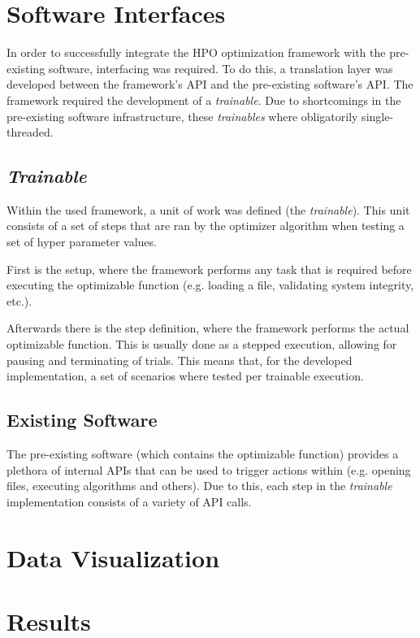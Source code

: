 \documentclass[runningheads]{llncs}
\begin{document}
\section{Software Interfaces}

In order to successfully integrate the HPO optimization framework with the pre-existing software, interfacing was required. To do this, a translation layer was developed between the framework's API and the pre-existing software's API. The framework required the development of a \textit{trainable}. Due to shortcomings in the pre-existing software infrastructure, these \textit{trainables} where obligatorily single-threaded.

\subsection{\textit{Trainable}}

Within the used framework, a unit of work was defined (the \textit{trainable}). This unit consists of a set of steps that are ran by the optimizer algorithm when testing a set of hyper parameter values.

First is the setup, where the framework performs any task that is required before executing the optimizable function (e.g. loading a file, validating system integrity, etc.).

Afterwards there is the step definition, where the framework performs the actual optimizable function. This is usually done as a stepped execution, allowing for pausing and terminating of trials. This means that, for the developed implementation, a set of scenarios where tested per trainable execution.

\subsection{Existing Software}

The pre-existing software (which contains the optimizable function) provides a plethora of internal APIs that can be used to trigger actions within (e.g. opening files, executing algorithms and others). Due to this, each step in the \textit{trainable} implementation consists of a variety of API calls.

\section{Data Visualization}

\section{Results}



\end{document}

